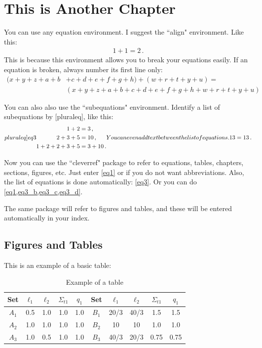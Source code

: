 \chapter{This is Another Chapter}\label{chap_chap2}

You can use any equation environment.
I suggest the ``align" environment.
Like this:
\begin{align}\label{eq1}
1+1=2 \,.
\end{align}
This is because this environment allows you to break your equations easily.
If an equation is broken, always number its first line only:
\begin{align}\label{eq2}
(x+y+z+a +b &+c+d+e+f+g+h) + (w+r+t+y+u) = \\
& (x+y+z+a+b+c+d+e+f+g+h+w+r+t+y+u) \nonumber
\end{align}

You can also also use the ``subequations" environment.
Identify a list of subequations by [pluraleq], like this: 
\begin{subequations}\label[pluraleq]{eq3}
\begin{align}
1+2 &= 3\,, \label{eq3_a}\\
2+3+5 &= 10\,,\label{eq3_b}\\
1+2+2+3+5 &= 3+10\,.\label{eq3_c}
\end{align}
You can even add text between the list of equations.
\begin{align}\label{eq3_d}
13 = 13\,.
\end{align}
\end{subequations}

Now you can use the ``cleverref" package to refer to equations, tables, chapters, sections, figures, etc.
Just enter \cref{eq1} or  if you do not want abbreviations.
Also, the list of equations is done automatically: \cref{eq3}. 
Or you can do \cref{eq1,eq3_b,eq3_c,eq3_d}. 

The same package will refer to figures and tables, and these will be entered automatically in your index.

\section{Figures and Tables}\label{sec_21}

This is an example of a basic table:
\begin{table}[htb]
\centering
\caption{Example of a table}\label{tab_1} 
\begin{tabular}{||c|c|c|c|c||c|c|c|c|c||} \hline \hline
\textbf{Set}  & $\ell_1$ & $\ell_2$ & $\Sigma_{t1}$ &$q_1$ & \textbf{Set}  & $\ell_1$ & $\ell_2$ & $\Sigma_{t1}$ &$q_1$ \\ \hline\hline
$A_1$ & 0.5 & 1.0 & 1.0 & 1.0 & $B_1$ & 20/3 & 40/3 & 1.5 & 1.5\\
\hline
$A_2$ & 1.0 & 1.0 & 1.0 & 1.0 & $B_2$ & 10 & 10 & 1.0 & 1.0\\
\hline
$A_3$ & 1.0 & 0.5 & 1.0 & 1.0 & $B_3$ & 40/3 & 20/3 & 0.75 & 0.75\\
 \hline\hline  
  \end{tabular}
\end{table}

